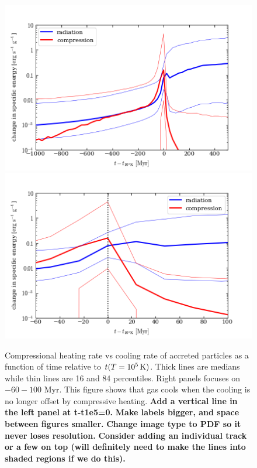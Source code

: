 \documentclass[fleqn,usenatbib]{mnras}
\begin{document}
\begin{figure}
\includegraphics[width=\columnwidth]{rad_vs_compress.png}
\includegraphics[width=\columnwidth]{rad_vs_compress_zoom.png}
\caption{
Compressional heating rate vs cooling rate of accreted particles as a function of time relative to $t(T=10^5\,{\rm K})$.
Thick lines are medians while thin lines are 16 and 84 percentiles.
Right panels focuses on $-60 - 100$ Myr.
This figure shows that gas cools when the cooling is no longer offset by compressive heating.
\textbf{
Add a vertical line in the left panel at t-t1e5=0.
}
\textbf{
Make labels bigger, and space between figures smaller.
}
\textbf{
Change image type to PDF so it never loses resolution.
}
\textbf{
Consider adding an individual track or a few on top (will definitely need to make the lines into shaded regions if we do this).
}
}
\end{figure}
\end{document}
